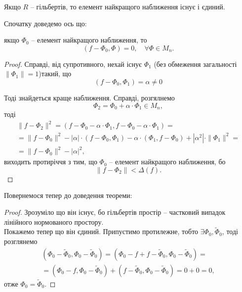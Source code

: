 \begin{theorem}
	Якщо $R$ -- гільбертів, то елемент найкращого наближення існує і єдиний.
\end{theorem}

Спочатку доведемо ось що: 
\begin{lemma}
	якщо $\Phi_0$ -- елемент найкращого наближення, то
	\begin{equation}
		\label{eq:2.8}
		(f - \Phi_0, \Phi) = 0, \quad \forall \Phi \in M_n.
	\end{equation}
\end{lemma}

\begin{proof}
	Справді, від супротивного, нехай існує $\Phi_1$ (без обмеження загальності $\|\Phi_1\| = 1$)такий, що 
	\begin{equation}
		\label{eq:2.9}
		\left( f - \Phi_0, \Phi_1 \right) = \alpha \ne 0
	\end{equation}

	Тоді знайдеться краще наближення. Справді, розгялнемо
	\begin{equation*}
		\Phi_2 = \Phi_0 + \alpha \cdot \Phi_1 \in M_n,
	\end{equation*}
	тоді
	\begin{multline}
		\| f - \Phi_2 \|^2 = \left( f - \Phi_0 - \alpha \cdot \Phi_1, f - \Phi_0 - \alpha \cdot \Phi_1 \right) = \\ = \| f - \Phi_0 \|^2 - |\alpha| \cdot (f - \Phi_0, \Phi_1) - \alpha \cdot (\Phi_1, f - \Phi_0) + |\alpha^2| \cdot \| \Phi_1\|^2 = \\ = \| f - \Phi_0 \|^2 - |\alpha|^2,
	\end{multline}
	виходить протиріччя з тим, що $\Phi_0$ -- елемент найкращого наближення, бо
	\begin{equation}
		\label{eq:2.10}
		\| f - \Phi_2 \| < \Delta(f).
	\end{equation}
\end{proof}

Повернемося тепер до доведення теореми:

\begin{proof}
	Зрозуміло що він існує, бо гільбертів простір -- частковий випадок лінійного нормованого простору. \\

	Покажемо тепер що він єдиний. Припустимо протилежне, тобто $\exists \Phi_0, \tilde \Phi_0$, тоді розглянемо
	\begin{multline}
		\label{eq:2.11}
		( \Phi_0 - \tilde \Phi_0, \Phi_0 - \tilde \Phi_0 ) = ( \Phi_0 -f + f - \tilde \Phi_0, \Phi_0 - \tilde \Phi_0 ) = \\ = ( \Phi_0 - f, \Phi_0 - \tilde \Phi_0 ) + (f - \tilde \Phi_0, \Phi_0 - \tilde \Phi_0 ) = 0 + 0 = 0,
	\end{multline}
	отже $\Phi_0 = \tilde \Phi_0$.
\end{proof}

% 
